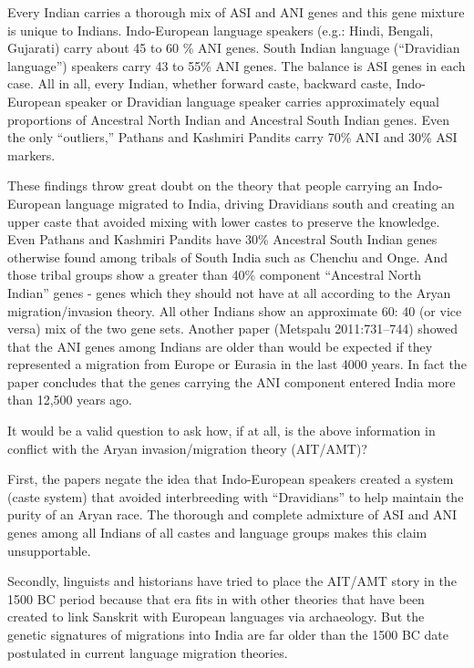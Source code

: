 Every Indian carries a thorough mix of ASI and ANI genes and this gene mixture is unique to Indians. Indo-European language speakers (e.g.: Hindi, Bengali, Gujarati) carry about 45 to 60 \% ANI genes. South Indian language (“Dravidian language”) speakers carry 43 to 55\% ANI genes. The balance is ASI genes in each case. All in all, every Indian, whether forward caste, backward caste, Indo-European speaker or Dravidian language speaker carries approximately equal proportions of Ancestral North Indian and Ancestral South Indian genes. Even the only “outliers,” Pathans and Kashmiri Pandits carry 70\% ANI and 30\% ASI markers.

These findings throw great doubt on the theory that people carrying an Indo-European language migrated to India, driving Dravidians south and creating an upper caste that avoided mixing with lower castes to preserve the knowledge. Even Pathans and Kashmiri Pandits have 30\% Ancestral South Indian genes otherwise found among tribals of South India such as Chenchu and Onge. And those tribal groups show a greater than 40\% component “Ancestral North Indian” genes - genes which they should not have at all according to the Aryan migration/invasion theory. All other Indians show an approximate 60: 40 (or vice versa) mix of the two gene sets. Another paper (Metspalu 2011:731–744) showed that the ANI genes among Indians are older than would be expected if they represented a migration from Europe or Eurasia in the last 4000 years. In fact the paper concludes that the genes carrying the ANI component entered India more than 12,500 years ago.

It would be a valid question to ask how, if at all, is the above information in conflict with the Aryan invasion/migration theory (AIT/AMT)?

First, the papers negate the idea that Indo-European speakers created a system (caste system) that avoided interbreeding with “Dravidians” to help maintain the purity of an Aryan race. The thorough and complete admixture of ASI and ANI genes among all Indians of all castes and language groups makes this claim unsupportable.

Secondly, linguists and historians have tried to place the AIT/AMT story in the 1500 BC period because that era fits in with other theories that have been created to link Sanskrit with European languages via archaeology. But the genetic signatures of migrations into India are far older than the 1500 BC date postulated in current language migration theories.

